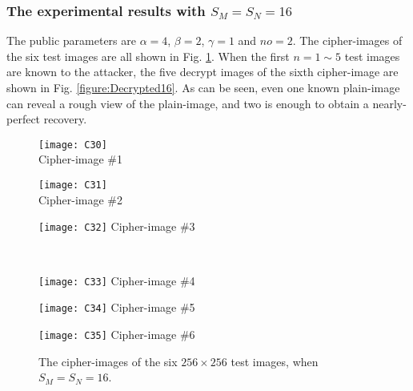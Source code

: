 \documentclass[final,3p,times,twocolumn]{elsarticle}
\newlength\figwidth
\newlength\sfigwidth
\newlength\vfigskip
\begin{document}
\subsubsection{The experimental results with $S_M=S_N=16$}

The public parameters are $\alpha=4$, $\beta=2$, $\gamma=1$ and
$no=2$. The cipher-images of the six test images are all shown in
Fig. \ref{figure:Experiment16}. When the first $n=1\sim 5$ test
images are known to the attacker, the five decrypt images of the
sixth cipher-image are shown in Fig. \ref{figure:Decrypted16}. As
can be seen, even one known plain-image can reveal a rough view of
the plain-image, and two is enough to obtain a nearly-perfect
recovery.

\begin{figure}[!htb]
\centering
\begin{minipage}{\sfigwidth}
\centering
\texttt{[image: C30]}\\
Cipher-image \#1
\end{minipage}
\begin{minipage}{\sfigwidth}
\centering
\texttt{[image: C31]}\\
Cipher-image \#2
\end{minipage}
\begin{minipage}{\sfigwidth}
\centering
\texttt{[image: C32]}
Cipher-image \#3
\end{minipage}\\[\vfigskip]
\begin{minipage}{\sfigwidth}
\centering
\texttt{[image: C33]}
Cipher-image \#4
\end{minipage}
\begin{minipage}{\sfigwidth}
\centering
\texttt{[image: C34]}
Cipher-image \#5
\end{minipage}
\begin{minipage}{\sfigwidth}
\centering
\texttt{[image: C35]}
Cipher-image \#6
\end{minipage}
\caption{The cipher-images of the six $256\times 256$ test images,
when $S_M=S_N=16$.} \label{figure:Experiment16}
\end{figure}
\end{document}
